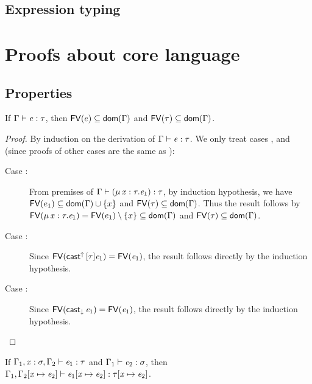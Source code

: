 \subsection{Expression typing}
\ottdefnctxsrc{}
\ottdefnexprsrc{}

\section{Proofs about core language}
\subsection{Properties}
\begin{lem}\label{lem:free}
    If $\Gamma  \vdash  \mathit{e}  :  \tau$, then $\mathsf{FV}(e) \subseteq \mathsf{dom}(\Gamma)$ and $\mathsf{FV}(\tau) \subseteq \mathsf{dom}(\Gamma)$.
\end{lem}

\begin{proof}
    By induction on the derivation of $\Gamma  \vdash  \mathit{e}  :  \tau$. We only treat cases ,  and  (since proofs of other cases are the same as \cc \cite{handbook}):
    \begin{description}
        \item[Case :] From premises of $\Gamma  \vdash  (  \mu \, \mathit{x}  :  \tau  .  \mathit{e_{{\mathrm{1}}}}  )  :  \tau$, by induction hypothesis, we have $\mathsf{FV}(e_1) \subseteq \mathsf{dom}(\Gamma) \cup \{x\}$ and $\mathsf{FV}(\tau) \subseteq \mathsf{dom}(\Gamma)$. Thus the result follows by $\mathsf{FV}(\mu \, \mathit{x}  :  \tau  .  \mathit{e_{{\mathrm{1}}}})=\mathsf{FV}(e_1) \setminus \{x\} \subseteq \mathsf{dom}(\Gamma)$ and $\mathsf{FV}(\tau) \subseteq \mathsf{dom}(\Gamma)$.
        \item[Case :] Since $\mathsf{FV}(\mathsf{cast}^{\uparrow} \, [  \tau  ]  \mathit{e_{{\mathrm{1}}}})=\mathsf{FV}(\mathit{e_{{\mathrm{1}}}})$, the result follows directly by the induction hypothesis.
        \item[Case :] Since $\mathsf{FV}(\mathsf{cast}_{\downarrow} \, \mathit{e_{{\mathrm{1}}}})=\mathsf{FV}(\mathit{e_{{\mathrm{1}}}})$, the result follows directly by the induction hypothesis.
    \end{description}
\end{proof}

\begin{lem}\label{lem:subst}
	If $\Gamma_{{\mathrm{1}}}  ,  \mathit{x}  :  \sigma  ,  \Gamma_{{\mathrm{2}}}  \vdash  \mathit{e_{{\mathrm{1}}}}  :  \tau$ and $\Gamma_{{\mathrm{1}}}  \vdash  \mathit{e_{{\mathrm{2}}}}  :  \sigma$, then $\Gamma_{{\mathrm{1}}}  ,  \Gamma_{{\mathrm{2}}}  [  \mathit{x}  \mapsto  \mathit{e_{{\mathrm{2}}}}  ]  \vdash  \mathit{e_{{\mathrm{1}}}}  [  \mathit{x}  \mapsto  \mathit{e_{{\mathrm{2}}}}  ]  :  \tau  [  \mathit{x}  \mapsto  \mathit{e_{{\mathrm{2}}}}  ]$.
\end{lem}

